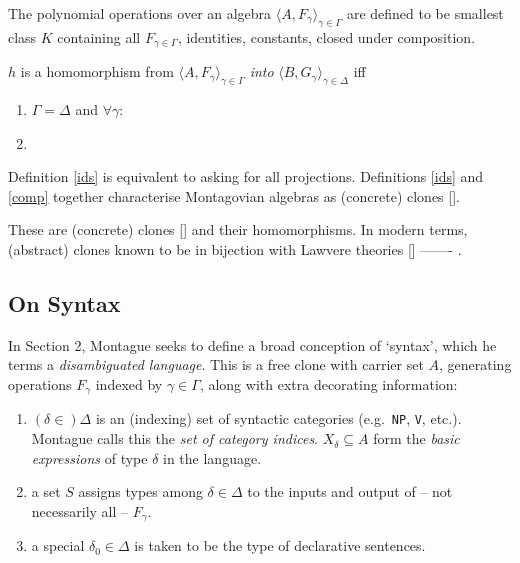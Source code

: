 \begin{defn}\label{polyop}

The polynomial operations over an algebra $\langle A, F_\gamma \rangle_{\gamma \in \Gamma}$ are defined to be smallest class $K$ containing all $F_{\gamma \in \Gamma}$, identities, constants, closed under composition.

\end{defn}

\begin{defn}\label{homo}

$h$ is a homomorphism from $\langle A, F_\gamma \rangle_{\gamma \in \Gamma}$ \emph{into} $\langle B, G_\gamma \rangle_{\gamma \in \Delta}$ iff

\begin{enumerate}
    \item{$\Gamma = \Delta$ and $\forall \gamma : $}
    \item{}
\end{enumerate}

\end{defn}

Definition \ref{ids} is equivalent to asking for all projections. Definitions \ref{ids} and \ref{comp} together characterise Montagovian algebras as (concrete) clones []. 


These are (concrete) clones [] and their homomorphisms. In modern terms, (abstract) clones known to be in bijection with Lawvere theories [] ------- . 

\subsection{On Syntax}

In Section 2, Montague seeks to define a broad conception of `syntax', which he terms a \emph{disambiguated language}. This is a free clone with carrier set $A$, generating operations $F_\gamma$ indexed by $\gamma \in \Gamma$, along with extra decorating information:

\begin{enumerate}
\item{$(\delta \in) \Delta$ is an (indexing) set of syntactic categories (e.g.~\texttt{NP}, \texttt{V}, etc.). Montague calls this the \emph{set of category indices}. $X_\delta \subseteq A$ form the \emph{basic expressions} of type $\delta$ in the language.}
\item{a set $S$ assigns types among $\delta \in \Delta$ to the inputs and output of -- not necessarily all -- $F_\gamma$.}
\item{a special $\delta_0 \in \Delta$ is taken to be the type of declarative sentences.}
\end{enumerate}


